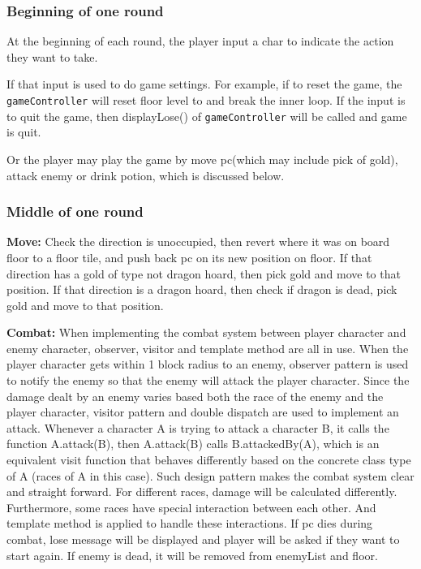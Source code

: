 \documentclass[11pt]{article}
\theoremstyle{plain} \newtheorem{theorem*}{Theorem}[subsection]
\begin{document}
\subsubsection{ Beginning of one round }

At the beginning of each round, the player input a char to indicate the 
action they want to take. 

If that input is used to do game settings. For example, if to reset the game,
the \texttt{gameController} will reset floor level to and break the inner
loop. If the input is to quit the game, then \textsf{displayLose()} of
\texttt{gameController} will be called and game is quit.

Or the player may play the game by move pc(which may include pick of gold),
attack enemy or drink potion, which is discussed below.


\subsubsection{Middle of one round}

\textbf{Move:} Check the direction is unoccupied, then revert where it was on
board \textsf{floor} to a floor tile, and push back pc on its new position on
\textsf{floor}.  If that direction has a gold of type not dragon hoard, then
pick gold and move to that position.  If that direction is a dragon hoard, then
check if dragon is dead, pick gold and move to that position.

\textbf{Combat:} When implementing the combat system between player character
and enemy character, observer, visitor and template method are all in use. When
the player character gets within 1 block radius to an enemy, observer pattern
is used to notify the enemy so that the enemy will attack the player character.
Since the damage dealt by an enemy varies based both the race of the enemy and
the player character, visitor pattern and double dispatch are used to implement
an attack. Whenever a character A is trying to attack a character B, it calls
the function \textsf{A.attack(B)}, then \textsf{A.attack(B)} calls \textsf{B.attackedBy(A)}, which is an
equivalent visit function that behaves differently based on the concrete class
type of A (races of A in this case). Such design pattern makes the combat
system clear and straight forward. For different races, damage will be
calculated differently. Furthermore, some races have special interaction
between each other. And template method is applied to handle these interactions.
If pc dies during combat, lose message will be displayed and player will be
asked if they want to start again. If enemy is dead, it will be removed from
\textsf{enemyList} and \textsf{floor}.
\end{document}
